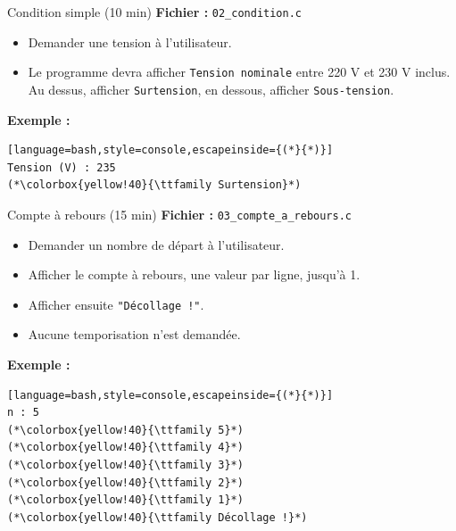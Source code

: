 \begin{UPSTIexercice}{Condition simple (10 min)}
  \textbf{Fichier :} \texttt{02\_condition.c}
  \begin{itemize}
    \item Demander une tension à l'utilisateur.
    \item Le programme devra afficher \texttt{Tension nominale} entre 220 V et 230 V inclus. Au dessus, afficher \texttt{Surtension}, en dessous, afficher \texttt{Sous-tension}.
  \end{itemize}

  \textbf{Exemple :}
  \begin{lstlisting}[language=bash,style=console,escapeinside={(*}{*)}]
Tension (V) : 235
(*\colorbox{yellow!40}{\ttfamily Surtension}*)
  \end{lstlisting}
\end{UPSTIexercice}

\begin{UPSTIexercice}{Compte à rebours (15 min)}
  \textbf{Fichier :} \texttt{03\_compte\_a\_rebours.c}
  \begin{itemize}
    \item Demander un nombre de départ à l'utilisateur.
    \item Afficher le compte à rebours, une valeur par ligne, jusqu'à 1.
    \item Afficher ensuite \texttt{"Décollage !"}.
    \item Aucune temporisation n'est demandée.
  \end{itemize}

  \textbf{Exemple :}
  \begin{lstlisting}[language=bash,style=console,escapeinside={(*}{*)}]
n : 5
(*\colorbox{yellow!40}{\ttfamily 5}*)
(*\colorbox{yellow!40}{\ttfamily 4}*)
(*\colorbox{yellow!40}{\ttfamily 3}*)
(*\colorbox{yellow!40}{\ttfamily 2}*)
(*\colorbox{yellow!40}{\ttfamily 1}*)
(*\colorbox{yellow!40}{\ttfamily Décollage !}*)
  \end{lstlisting}
\end{UPSTIexercice}

